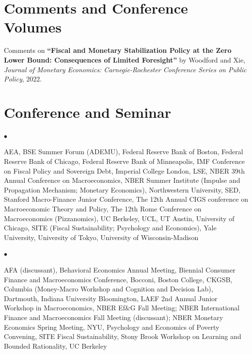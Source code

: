 \documentclass[line]{res}
\newenvironment{list1}{
  \begin{list}{\ding{113}}{%
      \setlength{\itemsep}{0.07in}
      \setlength{\parsep}{0in} \setlength{\parskip}{0in}
		\setlength{\topsep}{0.07in} \setlength{\partopsep}{0in} 
      \setlength{\leftmargin}{0.0in}}}{\end{list}}
\newenvironment{list2}{
  \begin{list}{$\bullet$}{%
      \setlength{\itemsep}{0in}
      \setlength{\parsep}{0in} \setlength{\parskip}{0in}
      \setlength{\topsep}{0in} \setlength{\partopsep}{0in} 
      \setlength{\leftmargin}{0in}}}{\end{list}}
\begin{document}
\begin{resume}

\section{\sc Comments and Conference Volumes} 
\begin{list1}
\item[] Comments on \textbf{“Fiscal and Monetary Stabilization Policy at the Zero Lower Bound: Consequences of Limited Foresight”} by Woodford and Xie, \emph{Journal of Monetary Economics: Carnegie-Rochester Conference Series on Public Policy}, 2022.
\end{list1}


\section{\sc Conference and Seminar}

\begin{list1}

\item[2024]
\begin{list2}
\item[] AEA, BSE Summer Forum (ADEMU), Federal Reserve Bank of Boston, Federal Reserve Bank of Chicago, Federal Reserve Bank of Minneapolis, IMF Conference on Fiscal Policy and Sovereign Debt, Imperial College London, LSE, NBER 39th Annual Conference on Macroeconomics, NBER Summer Institute (Impulse and Propagation Mechanism; Monetary Economics), Northwestern University, SED, Stanford Macro-Finance Junior Conference, The 12th Annual CIGS conference on Macroeconomic Theory and Policy, The 12th Rome Conference on Macroeconomics (Pizzanomics), UC Berkeley, UCL, UT Austin, University of Chicago, SITE (Fiscal Sustainability; Psychology and Economics), Yale University, University of Tokyo, University of Wisconsin-Madison
\end{list2}

\item[2023]
\begin{list2}
\item[] AFA (discussant), Behavioral Economics Annual Meeting, Biennial Consumer Finance and Macroeconomics Conference, Bocconi, Boston College, CKGSB, Columbia (Money-Macro Workshop and Cognition and Decision Lab), Dartmouth, Indiana University Bloomington, LAEF 2nd Annual Junior Workshop in Macroeconomics, NBER Ef\&G Fall Meeting; NBER International Finance and Macroeconomics Fall Meeting (discussant); NBER Monetary Economics Spring Meeting, NYU, Psychology and Economics of Poverty Convening, SITE Fiscal Sustainability, Stony Brook Workshop on Learning and Bounded Rationality, UC Berkeley
\end{list2}


\end{list1}
\end{resume}
\end{document}
